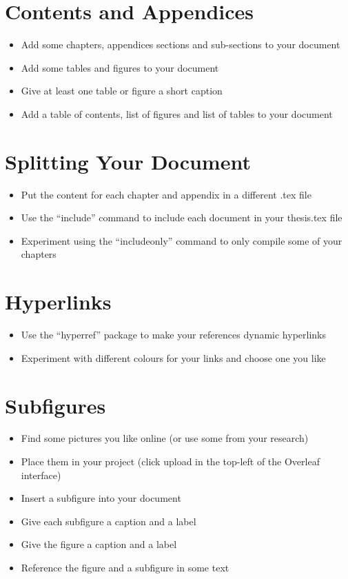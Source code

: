 \documentclass[11pt,a4paper]{article}
\begin{document}
\section{Contents and Appendices}
\begin{itemize}
\item Add some chapters, appendices sections and sub-sections to your document
\item Add some tables and figures to your document
\item Give at least one table or figure a short caption
\item Add a table of contents, list of figures and list of tables to your document
\end{itemize}

\section{Splitting Your Document}
\begin{itemize}
\item Put the content for each chapter and appendix in a different .tex file
\item Use the ``include'' command to include each document in your thesis.tex file
\item Experiment using the ``includeonly'' command to only compile some of your chapters
\end{itemize}

\section{Hyperlinks}
\begin{itemize}
\item Use the ``hyperref'' package to make your references dynamic hyperlinks
\item Experiment with different colours for your links and choose one you like
\end{itemize}

\section{Subfigures}
\begin{itemize}
\item Find some pictures you like online (or use some from your research)
\item Place them in your project (click upload in the top-left of the Overleaf interface)
\item Insert a subfigure into your document
\item Give each subfigure a caption and a label
\item Give the figure a caption and a label
\item Reference the figure and a subfigure in some text
\end{itemize}
\end{document}
